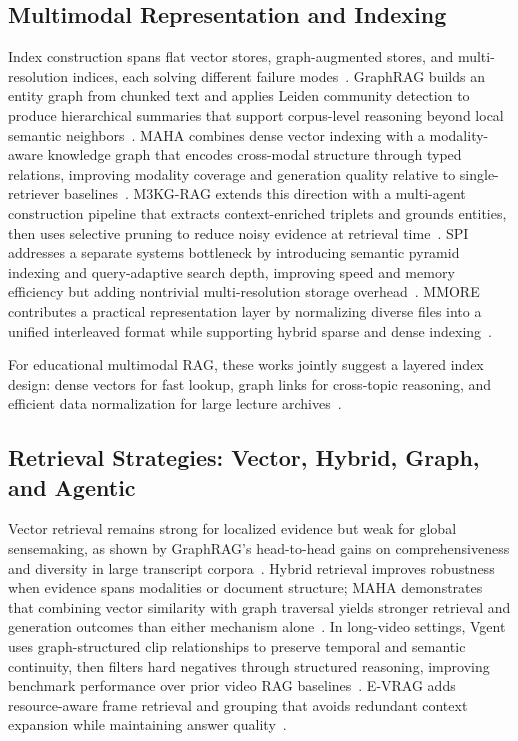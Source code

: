 \documentclass[conference]{IEEEtran}
\begin{document}
    \subsection{Multimodal Representation and Indexing}

    Index construction spans flat vector stores, graph-augmented stores, and multi-resolution indices, each solving different failure modes~\cite{edge2024local,rashmi2024multimodal,liu2024towards}. GraphRAG builds an entity graph from chunked text and applies Leiden community detection to produce hierarchical summaries that support corpus-level reasoning beyond local semantic neighbors~\cite{edge2024local}. MAHA combines dense vector indexing with a modality-aware knowledge graph that encodes cross-modal structure through typed relations, improving modality coverage and generation quality relative to single-retriever baselines~\cite{rashmi2024multimodal}. M3KG-RAG extends this direction with a multi-agent construction pipeline that extracts context-enriched triplets and grounds entities, then uses selective pruning to reduce noisy evidence at retrieval time~\cite{park2024m3kg}. SPI addresses a separate systems bottleneck by introducing semantic pyramid indexing and query-adaptive search depth, improving speed and memory efficiency but adding nontrivial multi-resolution storage overhead~\cite{liu2024towards}. MMORE contributes a practical representation layer by normalizing diverse files into a unified interleaved format while supporting hybrid sparse and dense indexing~\cite{sallinen2024mmore}.

    For educational multimodal RAG, these works jointly suggest a layered index design: dense vectors for fast lookup, graph links for cross-topic reasoning, and efficient data normalization for large lecture archives~\cite{edge2024local,sallinen2024mmore,rashmi2024multimodal}.

    \subsection{Retrieval Strategies: Vector, Hybrid, Graph, and Agentic}

    Vector retrieval remains strong for localized evidence but weak for global sensemaking, as shown by GraphRAG's head-to-head gains on comprehensiveness and diversity in large transcript corpora~\cite{edge2024local}. Hybrid retrieval improves robustness when evidence spans modalities or document structure; MAHA demonstrates that combining vector similarity with graph traversal yields stronger retrieval and generation outcomes than either mechanism alone~\cite{rashmi2024multimodal}. In long-video settings, Vgent uses graph-structured clip relationships to preserve temporal and semantic continuity, then filters hard negatives through structured reasoning, improving benchmark performance over prior video RAG baselines~\cite{shen2024vgent}. E-VRAG adds resource-aware frame retrieval and grouping that avoids redundant context expansion while maintaining answer quality~\cite{xu2024evrag}.
\end{document}
